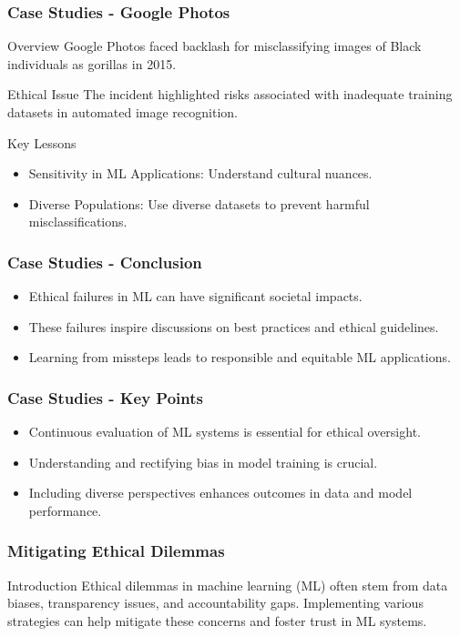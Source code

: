 \documentclass{beamer}
\begin{document}
\begin{frame}[fragile]
    \frametitle{Case Studies - Google Photos}
    \begin{block}{Overview}
        Google Photos faced backlash for misclassifying images of Black individuals as gorillas in 2015.
    \end{block}
    \begin{block}{Ethical Issue}
        The incident highlighted risks associated with inadequate training datasets in automated image recognition.
    \end{block}
    \begin{block}{Key Lessons}
        \begin{itemize}
            \item Sensitivity in ML Applications: Understand cultural nuances.
            \item Diverse Populations: Use diverse datasets to prevent harmful misclassifications.
        \end{itemize}
    \end{block}
\end{frame}

\begin{frame}[fragile]
    \frametitle{Case Studies - Conclusion}
    \begin{itemize}
        \item Ethical failures in ML can have significant societal impacts.
        \item These failures inspire discussions on best practices and ethical guidelines.
        \item Learning from missteps leads to responsible and equitable ML applications.
    \end{itemize}
\end{frame}

\begin{frame}[fragile]
    \frametitle{Case Studies - Key Points}
    \begin{itemize}
        \item Continuous evaluation of ML systems is essential for ethical oversight.
        \item Understanding and rectifying bias in model training is crucial.
        \item Including diverse perspectives enhances outcomes in data and model performance.
    \end{itemize}
\end{frame}

\begin{frame}[fragile]
    \frametitle{Mitigating Ethical Dilemmas}
    \begin{block}{Introduction}
        Ethical dilemmas in machine learning (ML) often stem from data biases, transparency issues, and accountability gaps. Implementing various strategies can help mitigate these concerns and foster trust in ML systems.
    \end{block}
\end{frame}
\end{document}
